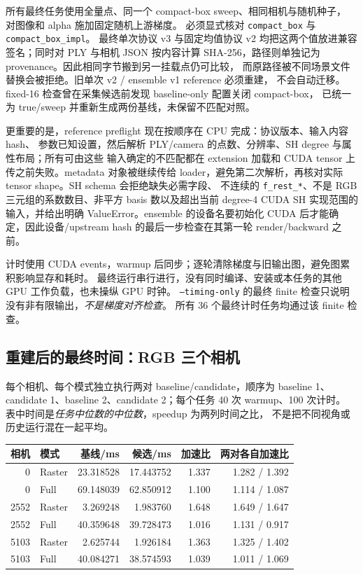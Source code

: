 所有最终任务使用全量点、同一个 compact-box sweep、相同相机与随机种子，
对图像和 alpha 施加固定随机上游梯度。
必须显式核对 \texttt{compact\_box} 与 \texttt{compact\_box\_impl}。
最终单次协议 v3 与固定均值协议 v2 均把这两个值放进兼容签名；同时对 PLY 与相机 JSON
按内容计算 SHA-256，路径则单独记为 provenance。因此相同字节搬到另一挂载点仍可比较，
而原路径被不同场景文件替换会被拒绝。旧单次 v2 / ensemble v1 reference 必须重建，
不会自动迁移。fixed-16 检查曾在采集候选前发现 baseline-only 配置关闭 compact-box，
已统一为 true/sweep 并重新生成两份基线，未保留不匹配对照。

更重要的是，reference preflight 现在按顺序在 CPU 完成：协议版本、输入内容 hash、
参数已知设置，然后解析 PLY/camera 的点数、分辨率、SH degree 与属性布局；所有可由这些
输入确定的不匹配都在 extension 加载和 CUDA tensor 上传之前失败。metadata 对象被继续传给
loader，避免第二次解析，再核对实际 tensor shape。SH schema 会拒绝缺失必需字段、
不连续的 \texttt{f\_rest\_*}、不是 RGB 三元组的系数数目、非平方 basis 数以及超出当前
degree-4 CUDA SH 实现范围的输入，并给出明确 ValueError。ensemble 的设备名要初始化
CUDA 后才能确定，因此设备/upstream hash 的最后一步检查在其第一轮 render/backward 之前。

计时使用 CUDA events，warmup 后同步；逐轮清除梯度与旧输出图，避免图累积影响显存和耗时。
最终运行串行进行，没有同时编译、安装或本任务的其他 GPU 工作负载，也未操纵 GPU 时钟。
\texttt{--timing-only} 的最终 finite 检查只说明没有非有限输出，\emph{不是梯度对齐检查}。
所有 36 个最终计时任务均通过该 finite 检查。

\subsection{重建后的最终时间：RGB 三个相机}

每个相机、每个模式独立执行两对 baseline/candidate，顺序为
baseline 1、candidate 1、baseline 2、candidate 2；每个任务
40 次 warmup、100 次计时。
表中时间是\emph{任务中位数的中位数}，speedup 为两列时间之比，
不是把不同视角或历史运行混在一起平均。

\begin{center}
\small
\begin{tabular}{rlrrrr}
\toprule
相机 & 模式 & 基线/ms & 候选/ms & 加速比 & 两对各自加速比\\
\midrule
0    & Raster & 23.318528 & 17.443752 & 1.337 & 1.282 / 1.392\\
0    & Full   & 69.148039 & 62.850912 & 1.100 & 1.114 / 1.087\\
2552 & Raster &  3.269248 &  1.983760 & 1.648 & 1.649 / 1.647\\
2552 & Full   & 40.359648 & 39.728473 & 1.016 & 1.131 / 0.917\\
5103 & Raster &  2.625744 &  1.926184 & 1.363 & 1.325 / 1.402\\
5103 & Full   & 40.084271 & 38.574593 & 1.039 & 1.011 / 1.069\\
\bottomrule
\end{tabular}
\end{center}

